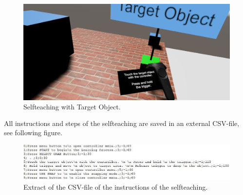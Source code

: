 \begin{figure}[H] 
	\center 
	\includegraphics[width=12cm]{Images/teaching3.PNG}
	\caption[Selfteaching with Target Object.]{Selfteaching with Target Object.}
	\label{fig:teaching3}
\end{figure}

All instructions and steps of the selfteaching are saved in an external CSV-file, see following figure. 

\begin{figure}[H] 
	\center 
	\includegraphics[width=15cm]{Images/selfteachingCSV.JPG}
	\caption[Extract of the CSV-file of the instructions of the selfteaching.]{Extract of the CSV-file of the instructions of the selfteaching.}
	\label{fig:teachingCSV}
\end{figure}

